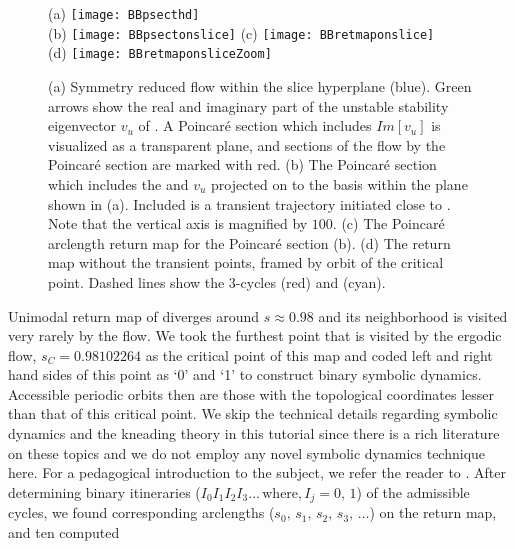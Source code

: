 {\begin{figure}
\centering
  (a) \texttt{[image: BBpsecthd]} \\
  (b) \texttt{[image: BBpsectonslice]}
  (c) \texttt{[image: BBretmaponslice]} \\
  (d) \texttt{[image: BBretmaponsliceZoom]}
\caption{(a) Symmetry reduced flow within the slice hyperplane (blue).
			Green arrows show the real and imaginary part of the unstable stability
			eigenvector $v_u$ of \REQV{}{}. A Poincar\'e section which includes
			$Im[v_u]$ is visualized as a transparent plane, and sections
			of the flow by the Poincar\'e section are marked with red.
		 (b) The Poincar\'e section which includes the \REQV{}{} and $v_u$ projected
			on to the basis within the plane shown in (a). Included is a
            transient trajectory initiated close to \REQV{}{}. Note that
		  	the vertical axis is magnified by $100$.
		 (c) The Poincar\'e arclength return map for the
		    Poincar\'e section (b).
		 (d) The return map without the transient points, framed by
            orbit of the critical point.
		 	Dashed lines show the 3-cycles  (red) and  (cyan).}
\label{fig:psectandretmap}
\end{figure}

Unimodal return map of  diverges around 
$s \approx 0.98$ and its neighborhood is visited very rarely by the flow. We 
took the furthest point that is visited by the ergodic flow, $s_C=0.98102264$ 
as the critical point of this map and coded left and right hand sides of this
point as `0' and `1' to construct binary symbolic dynamics. Accessible periodic
orbits then are those with the topological coordinates lesser than that of this
critical point. We skip the technical details regarding symbolic dynamics and the
kneading theory in this tutorial since there is a rich literature on these topics 
and we do not employ any novel symbolic dynamics technique here. For a pedagogical 
introduction to the subject, we refer the reader to . 
After determining binary itineraries 
($I_0 I_1 I_2 I_3 \dots\, \mbox{where,}\, I_j = 0,\,1$) 
of the admissible cycles, we found corresponding arclengths 
(${s_0,\,s_1,\,s_2,\,s_3,\,\dots}$) on the return map, and ten computed 

}
